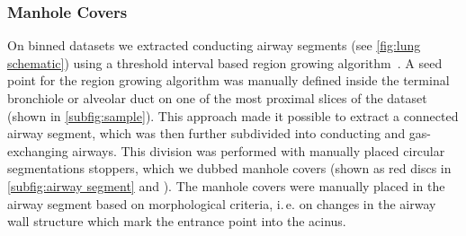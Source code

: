 \documentclass[%
	paper=a4,%
	abstract=true,%
	]{scrartcl}
\newcommand{\ie}{i.\,e.\xspace}
\begin{document}
\subsubsection{Manhole Covers\label{sec:manholecovers}}
On binned datasets we extracted conducting airway segments (see \autoref{fig:lung schematic}) using a threshold interval based region growing algorithm~\cite{Zucker1976}. A seed point for the region growing algorithm was manually defined inside the terminal bronchiole or alveolar duct on one of the most proximal slices of the dataset (shown in \autoref{subfig:sample}). This approach made it possible to extract a connected airway segment, which was then further subdivided into conducting and gas-exchanging airways. This division was performed with manually placed circular segmentations stoppers, which we dubbed manhole covers (shown as red discs in \autoref{subfig:airway segment} and ). The manhole covers were manually placed in the airway segment based on morphological criteria, \ie on changes in the airway wall structure which mark the entrance point into the acinus.
\end{document}
